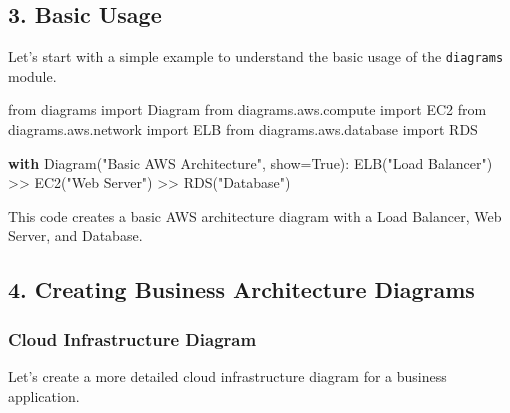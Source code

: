 \documentclass[
  letterpaper,
  DIV=11,
  numbers=noendperiod]{scrreprt}
\newenvironment{Shaded}{\begin{snugshade}}{\end{snugshade}}
\newcommand{\ControlFlowTok}[1]{\textcolor[rgb]{0.00,0.23,0.31}{\textbf{#1}}}
\newcommand{\ImportTok}[1]{\textcolor[rgb]{0.00,0.46,0.62}{#1}}
\newcommand{\NormalTok}[1]{\textcolor[rgb]{0.00,0.23,0.31}{#1}}
\newcommand{\OperatorTok}[1]{\textcolor[rgb]{0.37,0.37,0.37}{#1}}
\newcommand{\StringTok}[1]{\textcolor[rgb]{0.13,0.47,0.30}{#1}}
\newcommand{\VariableTok}[1]{\textcolor[rgb]{0.07,0.07,0.07}{#1}}
\begin{document}
\subsection{3. Basic Usage}\label{basic-usage-2}

Let's start with a simple example to understand the basic usage of the
\texttt{diagrams} module.

\begin{Shaded}
\begin{Highlighting}[]
\ImportTok{from}\NormalTok{ diagrams }\ImportTok{import}\NormalTok{ Diagram}
\ImportTok{from}\NormalTok{ diagrams.aws.compute }\ImportTok{import}\NormalTok{ EC2}
\ImportTok{from}\NormalTok{ diagrams.aws.network }\ImportTok{import}\NormalTok{ ELB}
\ImportTok{from}\NormalTok{ diagrams.aws.database }\ImportTok{import}\NormalTok{ RDS}

\ControlFlowTok{with}\NormalTok{ Diagram(}\StringTok{"Basic AWS Architecture"}\NormalTok{, show}\OperatorTok{=}\VariableTok{True}\NormalTok{):}
\NormalTok{    ELB(}\StringTok{"Load Balancer"}\NormalTok{) }\OperatorTok{\textgreater{}\textgreater{}}\NormalTok{ EC2(}\StringTok{"Web Server"}\NormalTok{) }\OperatorTok{\textgreater{}\textgreater{}}\NormalTok{ RDS(}\StringTok{"Database"}\NormalTok{)}
\end{Highlighting}
\end{Shaded}

This code creates a basic AWS architecture diagram with a Load Balancer,
Web Server, and Database.

\subsection{4. Creating Business Architecture
Diagrams}\label{creating-business-architecture-diagrams}

\subsubsection{Cloud Infrastructure
Diagram}\label{cloud-infrastructure-diagram}

Let's create a more detailed cloud infrastructure diagram for a business
application.
\end{document}
